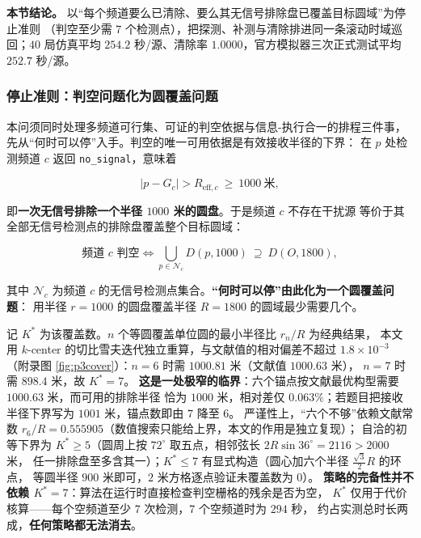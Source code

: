 \documentclass[withoutpreface, bwprint]{cumcmthesis}
\begin{document}
\textbf{本节结论。} 以“每个频道要么已清除、要么其无信号排除盘已覆盖目标圆域”为停止准则
（判空至少需 $7$ 个检测点），把探测、补测与清除排进同一条滚动时域巡回；$40$ 局仿真平均
$254.2$ 秒/源、清除率 $1.0000$，官方模拟器三次正式测试平均 $252.7$ 秒/源。

\subsubsection{停止准则：判空问题化为圆覆盖问题}

本问须同时处理多频道可行集、可证的判空依据与信息-执行合一的排程三件事，
先从“何时可以停”入手。判空的唯一可用依据是有效接收半径的下界：
在 $p$ 处检测频道 $c$ 返回 \verb|no_signal|，意味着

\begin{equation}
  \label{eq:p3exclude}
  \lvert p-G_c\rvert > R_{\mathrm{eff},c}\ \ge\ 1000\ \text{米},
\end{equation}

即\textbf{一次无信号排除一个半径 $1000$ 米的圆盘}。于是频道 $c$ 不存在干扰源
等价于其全部无信号检测点的排除盘覆盖整个目标圆域：

\begin{equation}
  \label{eq:p3empty}
  \text{频道 } c \text{ 判空}\iff
  \bigcup_{p\in \mathcal{N}_c} D(p,1000)\ \supseteq\ D(O,1800),
\end{equation}

其中 $\mathcal{N}_c$ 为频道 $c$ 的无信号检测点集合。\textbf{“何时可以停”由此化为一个圆覆盖问题}：
用半径 $r=1000$ 的圆盘覆盖半径 $R=1800$ 的圆域最少需要几个。

记 $K^{*}$ 为该覆盖数。$n$ 个等圆覆盖单位圆的最小半径比 $r_n/R$ 为经典结果，
本文用 $k$-center 的切比雪夫迭代独立重算，与文献值\cite{neville,melissen}的相对偏差不超过 $1.8\times10^{-3}$
（附录图 \ref{fig:p3cover}）：$n=6$ 时需 $1000.81$ 米（文献值 $1000.63$ 米），
$n=7$ 时需 $898.4$ 米，故 $K^{*}=7$。
\textbf{这是一处极窄的临界}：六个锚点按文献最优构型需要 $1000.63$ 米，而可用的排除半径
恰为 $1000$ 米，相对差仅 $0.063\%$；若题目把接收半径下界写为 $1001$ 米，锚点数即由 $7$ 降至 $6$。
严谨性上，“六个不够”依赖文献常数 $r_6/R=0.555905$（数值搜索只能给上界，本文的作用是独立复现）；
自洽的初等下界为 $K^{*}\ge 5$（圆周上按 $72^\circ$ 取五点，相邻弦长 $2R\sin36^\circ=2116>2000$ 米，
任一排除盘至多含其一）；$K^{*}\le 7$ 有显式构造（圆心加六个半径 $\tfrac{\sqrt3}{2}R$ 的环点，
等圆半径 $900$ 米即可，$2$ 米方格逐点验证未覆盖数为 $0$）。
\textbf{策略的完备性并不依赖 $K^{*}=7$}：算法在运行时直接检查判空栅格的残余是否为空，
$K^{*}$ 仅用于代价核算——每个空频道至少 $7$ 次检测，$7$ 个空频道时为 $294$ 秒，
约占实测总时长两成，\textbf{任何策略都无法消去}。
\end{document}
